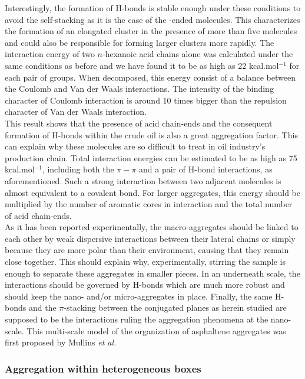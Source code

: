 Interestingly, the formation of H-bonds is stable enough under these conditions to avoid the self-stacking as it is the case of the -ended molecules. This characterizes the formation of an elongated cluster in the presence of more than five molecules and could also be responsible for forming larger clusters more rapidly. The interaction energy of two $n$-hexanoic acid chains alone was calculated under the same conditions as before and we have found it to be as high as 22 kcal.mol$^{-1}$ for each pair of  groups. When decomposed, this energy consist of a balance between the Coulomb and Van der Waals interactions. The intensity of the binding character of Coulomb interaction is around 10 times bigger than the repulsion character of Van der Waals interaction.\\ 

This result shows that the presence of acid chain-ends and the consequent formation of H-bonds within the crude oil is also a great aggregation factor. This can explain why these molecules are so difficult to treat in oil industry's production chain. Total interaction energies can be estimated to be as high as 75 kcal.mol$^{-1}$, including both the $\pi-\pi$ and a pair of H-bond interactions, as aforementioned. Such a strong interaction between two adjacent molecules is almost equivalent to a covalent bond. For larger aggregates, this energy should be multiplied by the number of aromatic cores in interaction and the total number of acid chain-ends.\\

As it has been reported experimentally,\cite{durand2010effect} the macro-aggregates should be linked to each other by weak dispersive interactions between their lateral chains or simply because they are more polar than their environment, causing that they remain close together. This should explain why, experimentally, stirring the sample is enough to separate these aggregates in smaller pieces. In an underneath scale, the interactions should be governed by H-bonds which are much more robust and should keep the nano- and/or micro-aggregates in place. Finally, the same H-bonds and the $\pi$-stacking between the conjugated planes as herein studied are supposed to be the interactions ruling the aggregation phenomena at the nano-scale. This multi-scale model of the organization of asphaltene aggregates was first proposed by Mullins \textit{et al.}\cite{mullins2010modified,mullins2011asphaltenes,mullins2012advances}

\subsubsection{Aggregation within heterogeneous boxes}

